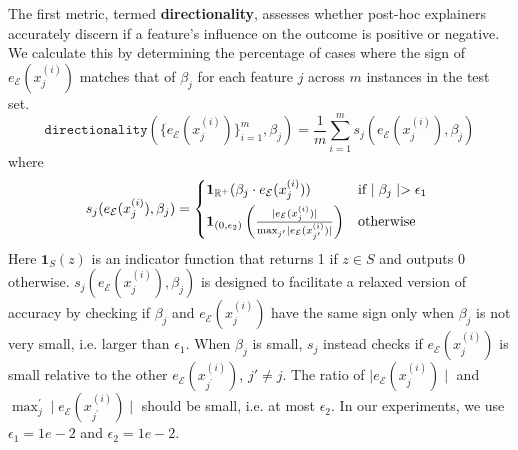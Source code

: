 \documentclass[mnsc,blindrev]{informs3}
\newcommand{\mE}{\mathcal{E}}
\begin{document}
    The first metric, termed \textbf{directionality}, assesses whether post-hoc explainers  accurately discern if a feature's influence on the outcome is positive or negative. We calculate this by determining the percentage of cases where the sign of $e_\mE(x^{(i)}_j)$ matches that of $\beta_j$ for each feature $j$ across $m$ instances in the test set. %
    \begin{equation}
        \label{eq:acc}
        \texttt{directionality}(\{e_\mE(x^{(i)}_j)\}_{i=1}^m,\beta_j) = \frac{1}{m} \sum_{i=1}^m s_j( e_\mE(x^{(i)}_j),\beta_j)
    \end{equation}
    where 
    \begin{equation*}
        s_j(e_\mE(x^{(i)}_j),\beta_j) = \begin{cases*}
                    \mathbf{1}_{\mathbb{R}^+}(\beta_j \cdot e_\mE(x^{(i)}_j)) & if  $\mid \beta_j\mid > \epsilon_1$  \\
                     \mathbf{1}_{(0,\epsilon_2)}\left(\frac{\mid e_\mE(x^{(i)}_j)\mid }{\max_{j'} \mid e_\mE(x^{(i)}_{j'})\mid}\right) & otherwise
                 \end{cases*}
    \end{equation*}
    Here $\mathbf{1}_S(z)$ is an indicator function that returns 1 if $z\in S$ and outputs 0 otherwise. $s_j(e_\mE(x^{(i)}_j),\beta_j)$ is designed to facilitate a relaxed version of accuracy by checking if  $\beta_j$ and $e_\mE(x^{(i)}_j)$ have the same sign only when $\beta_j$ is not very small, i.e. larger than $\epsilon_1$. When $\beta_j$ is small, $s_j$ instead checks if $e_\mE(x^{(i)}_j)$ is small relative to the other $e_\mE(x^{(i)}_{j^{\prime}})$, $j\prime \neq j$. The ratio of $\mid e_\mE(x^{(i)}_j)\mid $ and $\max_j^\prime \mid e_\mE(x^{(i)}_{j^\prime})\mid$ should be small, i.e. at most $\epsilon_2$.
    In our experiments, we use $\epsilon_1=1e-2$ and $\epsilon_2=1e-2$. 
    
\end{document}
